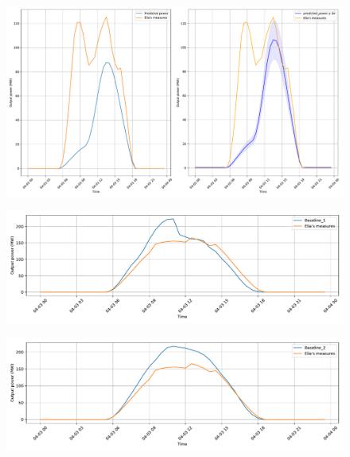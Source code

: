 \documentclass[a4paper, 12pt]{article}
\begin{document}
\begin{figure}[H]
    \centering
    \includegraphics[width=\textwidth]{resources/pdf/comparison_naive_posterior (27-03-2020).pdf}
    \label{fig:naive_posterior_3_april}
\end{figure}
\begin{figure}[H]
    \centering
    \includegraphics[width=\textwidth]{resources/pdf/baseline_1 (27-03-2020).pdf}
    \label{fig:base_1_elia_3_april}
\end{figure}
\begin{figure}[H]
    \centering
    \includegraphics[width=\textwidth]{resources/pdf/baseline_2 (27-03-2020).pdf}
    \label{fig:base_2_elia_3_april}
\end{figure}
\end{document}
